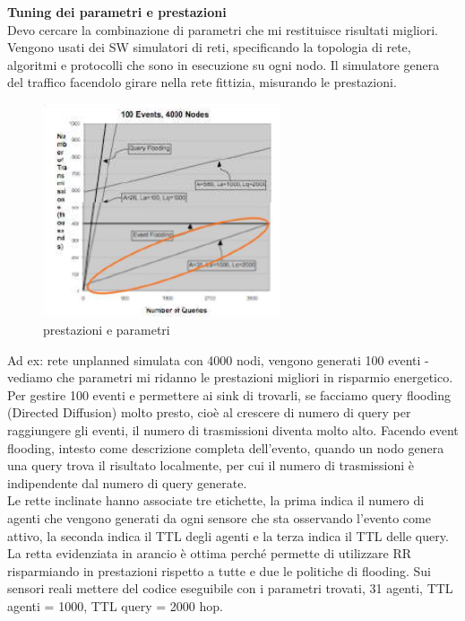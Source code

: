 \documentclass[12pt,italian]{report}
\begin{document}
\bigbreak
\noindent \textbf{Tuning dei parametri e prestazioni} \\
Devo cercare la combinazione di parametri che mi restituisce risultati migliori. Vengono usati dei SW simulatori di reti, specificando la topologia di rete, algoritmi e protocolli che sono in esecuzione su ogni nodo. Il simulatore  genera del traffico facendolo girare nella rete fittizia, misurando le prestazioni.
\begin{figure}[h]
\centering
\includegraphics[width=70mm]{img/presta.PNG}
\caption{prestazioni e parametri}
\label{fig:prestazioni}
\end{figure}
 Ad ex: rete unplanned simulata con 4000 nodi, vengono generati 100 eventi - vediamo che parametri mi ridanno le prestazioni migliori in risparmio energetico. Per gestire 100 eventi e permettere ai sink di trovarli, se facciamo query flooding (Directed Diffusion) molto presto, cioè al crescere di numero di query per raggiungere gli eventi, il numero di trasmissioni diventa molto alto. Facendo event flooding, intesto come descrizione completa dell'evento, quando un nodo genera una query trova il risultato localmente, per cui il numero di trasmissioni è indipendente dal numero di query generate. \\ Le rette inclinate hanno associate tre etichette, la prima indica il numero di agenti che vengono generati da ogni sensore che sta osservando l'evento come attivo, la seconda indica il TTL degli agenti e la terza indica il TTL delle query. \\ La retta evidenziata in arancio è ottima perché permette di utilizzare RR risparmiando in prestazioni rispetto a tutte e due le politiche di flooding. Sui sensori reali mettere del codice eseguibile con i parametri trovati, 31 agenti, TTL agenti = 1000, TTL query = 2000 hop. 
\end{document}
